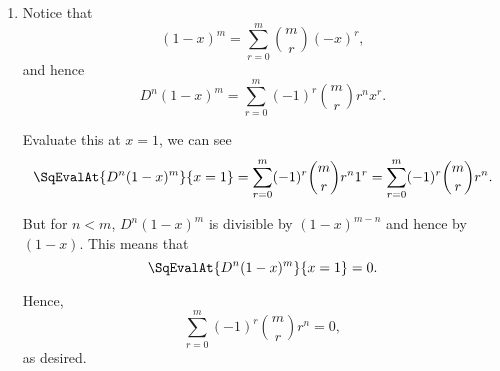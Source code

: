 \begin{enumerate}
    \item Notice that
          \[
              (1 - x)^m = \sum_{r = 0}^{m} \binom{m}{r} (-x)^r,
          \]
          and hence
          \[
              D^n (1 - x)^m = \sum_{r = 0}^{m} (-1)^r \binom{m}{r} r^n x^r.
          \]

          Evaluate this at \(x = 1\), we can see
          \[
              \SqEvalAt{D^n (1 - x)^m}{x = 1} = \sum_{r = 0}^{m} (-1)^r \binom{m}{r} r^n 1^r =  \sum_{r = 0}^{m} (-1)^r \binom{m}{r} r^n.
          \]

          But for \(n < m\), \(D^n (1 - x)^m\) is divisible by \((1 - x)^{m - n}\) and hence by \((1 - x)\). This means that
          \[
              \SqEvalAt{D^n (1 - x)^m}{x = 1} = 0.
          \]

          Hence,
          \[
              \sum_{r = 0}^{m} (-1)^r \binom{m}{r} r^n = 0,
          \]
          as desired.
\end{enumerate}